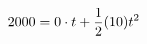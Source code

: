 \documentclass[preview]{standalone}
\begin{document}
\begin{align*}
\special{dvisvgm:raw <g id='unique000'>}2000 = 0 \cdot t + \frac{1}{2} (10) t^2\special{dvisvgm:raw </g>}
\end{align*}
\end{document}
